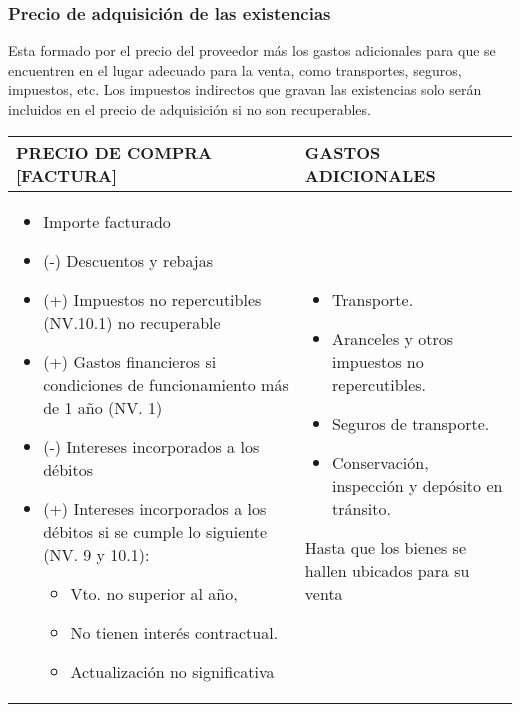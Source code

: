 \documentclass[a4paper,12pt]{article}
\begin{document}
\subsubsection{Precio de adquisición de las existencias}

Esta formado por el precio del proveedor más los gastos adicionales para que se encuentren en el lugar adecuado para la venta, como transportes, seguros, impuestos, etc. Los impuestos indirectos que gravan las existencias solo serán incluidos en el precio de adquisición si no son recuperables.


\begin{table}[H]
    \begin{tabular}{|p{5cm}|p{5cm}|}
    \hline
    \textbf{PRECIO DE COMPRA [FACTURA]} & \textbf{GASTOS ADICIONALES} \\ \hline
    \begin{itemize}
        \item Importe facturado
        \item (-) Descuentos y rebajas
        \item (+) Impuestos no repercutibles (NV.10.1) no recuperable
        \item (+) Gastos financieros si condiciones de funcionamiento más de 1 año (NV. 1)
        \item (-) Intereses incorporados a los débitos
        \item (+) Intereses incorporados a los débitos si se cumple lo siguiente (NV. 9 y 10.1):
        \begin{itemize}
            \item Vto. no superior al año,
            \item No tienen interés contractual.
            \item Actualización no significativa
        \end{itemize}
    \end{itemize} & 
    \begin{itemize}
        \item Transporte.
        \item Aranceles y otros impuestos no repercutibles.
        \item Seguros de transporte.
        \item Conservación, inspección y depósito en tránsito.
    \end{itemize} 
    Hasta que los bienes se hallen ubicados para su venta 
    \\ \hline
    \end{tabular}
\end{table} 
    
\end{document}
